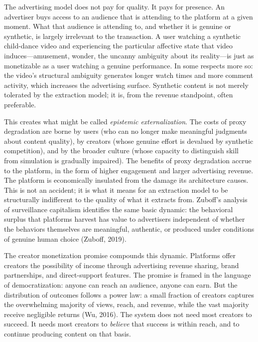\documentclass[12pt, a4paper]{article}
\begin{document}
The advertising model does not pay for quality. It pays for presence. An advertiser buys access to an audience that is attending to the platform at a given moment. What that audience is attending to, and whether it is genuine or synthetic, is largely irrelevant to the transaction. A user watching a synthetic child-dance video and experiencing the particular affective state that video induces---amusement, wonder, the uncanny ambiguity about its reality---is just as monetizable as a user watching a genuine performance. In some respects more so: the video's structural ambiguity generates longer watch times and more comment activity, which increases the advertising surface. Synthetic content is not merely tolerated by the extraction model; it is, from the revenue standpoint, often preferable.

This creates what might be called \textit{epistemic externalization}. The costs of proxy degradation are borne by users (who can no longer make meaningful judgments about content quality), by creators (whose genuine effort is devalued by synthetic competition), and by the broader culture (whose capacity to distinguish skill from simulation is gradually impaired). The benefits of proxy degradation accrue to the platform, in the form of higher engagement and larger advertising revenue. The platform is economically insulated from the damage its architecture causes. This is not an accident; it is what it means for an extraction model to be structurally indifferent to the quality of what it extracts from. Zuboff's analysis of surveillance capitalism identifies the same basic dynamic: the behavioral surplus that platforms harvest has value to advertisers independent of whether the behaviors themselves are meaningful, authentic, or produced under conditions of genuine human choice (Zuboff, 2019).

The creator monetization promise compounds this dynamic. Platforms offer creators the possibility of income through advertising revenue sharing, brand partnerships, and direct-support features. The promise is framed in the language of democratization: anyone can reach an audience, anyone can earn. But the distribution of outcomes follows a power law: a small fraction of creators captures the overwhelming majority of views, reach, and revenue, while the vast majority receive negligible returns (Wu, 2016). The system does not need most creators to succeed. It needs most creators to \textit{believe} that success is within reach, and to continue producing content on that basis.
\end{document}
